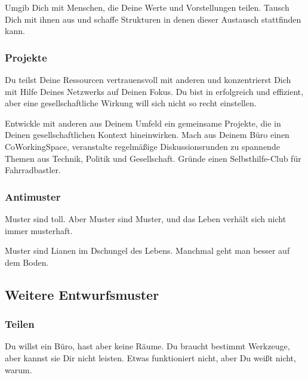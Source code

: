 {{Umgib Dich mit Menschen, die Deine Werte und Vorstellungen teilen.
%
Tausch Dich mit ihnen aus und schaffe Strukturen in denen dieser Austausch stattfinden kann.



\subsubsection{Projekte}
\begin{em}
Du teilst Deine Ressourcen vertrauensvoll mit anderen und konzentrierst Dich mit Hilfe Deines 
Netzwerks auf Deinen Fokus. Du bist in erfolgreich und effizient, aber eine gesellschaftliche Wirkung 
will sich nicht so recht einstellen.
\end{em}



Entwickle mit anderen aus Deinem Umfeld ein gemeinsame Projekte, die in Deinen gesellschaftlichen Kontext  hineinwirken.  Mach  aus  Deinem  Büro  einen  CoWorkingSpace,  veranstalte  regelmäßige Diskussionsrunden  zu  spannende  Themen  aus  Technik,  Politik  und  Gesellschaft.  Gründe  einen Selbsthilfe-Club für Fahrradbastler.



\subsubsection{Antimuster}
\begin{em}
Muster sind toll.
%
Aber Muster sind Muster, und das Leben verhält sich nicht immer musterhaft.
\end{em}
%



Muster sind Lianen im Dschungel des Lebens. Manchmal geht man besser auf dem Boden.





\subsection{Weitere Entwurfsmuster}


\subsubsection{Teilen}
\begin{em}
Du willst ein Büro, hast aber keine Räume.
%
Du braucht bestimmt Werkzeuge, aber kannst sie Dir nicht leisten.
%
Etwas funktioniert nicht, aber Du weißt nicht, warum.
\end{em}



}}
